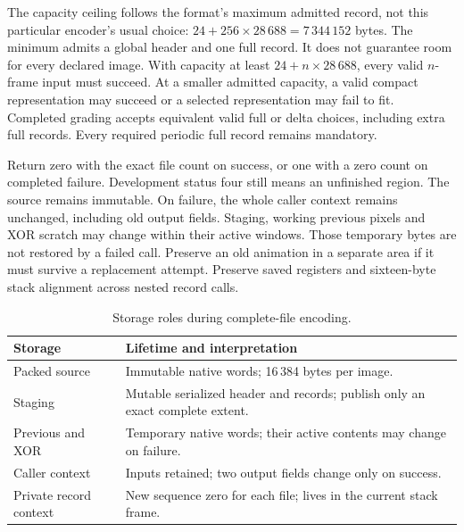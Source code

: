 The capacity ceiling follows the format's maximum admitted record, not this
particular encoder's usual choice: $24+256\times28\,688=7\,344\,152$ bytes.
The minimum admits a global header and one full record. It does not guarantee room
for every declared image. With capacity at least $24+n\times28\,688$, every valid
$n$-frame input must succeed. At a smaller admitted capacity, a valid compact
representation may succeed or a selected representation may fail to fit.
Completed grading accepts equivalent valid full or delta choices, including extra
full records. Every required periodic full record remains mandatory.

Return zero with the exact file count on success, or one with a zero count on
completed failure. Development status four still means an unfinished region.
The source remains immutable. On failure, the whole caller context remains unchanged,
including old output fields. Staging, working previous pixels and XOR scratch may
change within their active windows. Those temporary bytes are not restored by a
failed call. Preserve an old animation in a separate area if it must survive a
replacement attempt. Preserve saved registers and sixteen-byte stack alignment
across nested record calls.

\begin{table}[htbp]
  \centering
  \caption{Storage roles during complete-file encoding.}
  \label{tab:video-file-encode-storage}
  \begin{tabular}{p{1.5in} p{3.5in}}
    \toprule
    Storage                & Lifetime and interpretation                                                   \\
    \midrule
    Packed source          & Immutable native words; 16\,384 bytes per image.                              \\
    Staging                & Mutable serialized header and records; publish only an exact complete extent. \\
    Previous and XOR       & Temporary native words; their active contents may change on failure.          \\
    Caller context         & Inputs retained; two output fields change only on success.                    \\
    Private record context & New sequence zero for each file; lives in the current stack frame.            \\
    \bottomrule
  \end{tabular}
\end{table}

